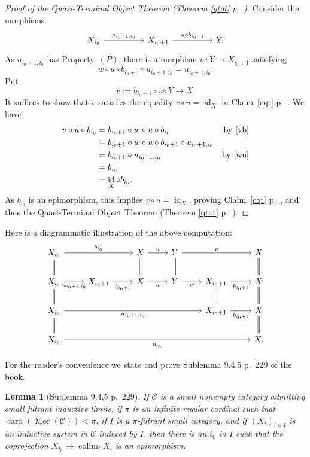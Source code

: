 \documentclass[12pt]{article}
\newtheorem{lem}[thm]{Lemma}
\theoremstyle{remark}
\theoremstyle{definition}
\newcommand{\C}{\mathcal C}
\DeclareMathOperator*{\colim}{colim}
\DeclareMathOperator{\card}{card}
\DeclareMathOperator{\id}{id}
\DeclareMathOperator{\Mor}{Mor}
\begin{document}
\begin{proof}[Proof of the Quasi-Terminal Object Theorem (Theorem \ref{qtot} p.~\pageref{qtot})]
Consider the morphisms 
$$
\begin{tikzcd}
X_{i_0}\ar{rr}{u_{i_0+1,i_0}}&&X_{i_0+1}\ar{rr}{u\circ b_{i_0+1}}&&Y.
\end{tikzcd}
$$
As $u_{i_0+1,i_0}$ has Property~$(P)$, there is a morphism $w:Y\to X_{i_0+1}$ satisfying  
%
\begin{equation}\label{wu}
w\circ u\circ b_{i_0+1}\circ u_{i_0+1,i_0}=u_{i_0+1,i_0}.
\end{equation}  
% 
Put
%
\begin{equation}\label{vb}
v:=b_{i_0+1}\circ w:Y\to X.
\end{equation}
%
It suffices to show that $v$ satisfies the equality $v\circ u=\id_X$ in Claim~\ref{cqt} p.~\pageref{cqt}. We have 
%
\begin{align*}
v\circ u\circ b_{i_0}&=b_{i_0+1}\circ w\circ u\circ b_{i_0}&\text{by \eqref{vb}}\\ 
&=b_{i_0+1}\circ w\circ u\circ b_{i_0+1}\circ u_{i_0+1,i_0}\\ 
&=b_{i_0+1}\circ u_{i_0+1,i_0}&\text{by \eqref{wu}}\\ 
&=b_{i_0}\\ 
&=\id_X\circ b_{i_0}. 
\end{align*}
%
As $b_{i_0}$ is an epimorphism, this implies $v\circ u=\id_X$, proving Claim~\ref{cqt} p.~\pageref{cqt}, and thus the Quasi-Terminal Object Theorem (Theorem \ref{qtot} p.~\pageref{qtot}). 
\end{proof}

Here is a diagrammatic illustration of the above computation:
$$
\begin{tikzcd}
X_{i_0}\ar[equal]{d}\ar{rr}{b_{i_0}}&&X\ar[equal]{d}\ar{r}{u}&Y\ar[equal]{d}\ar{rr}{v}&&X\ar[equal]{d}\\ 
X_{i_0}\ar[equal]{d}\ar{r}[swap]{u_{i_0+1,i_0}}&X_{i_0+1}\ar{r}[swap]{b_{i_0+1}}&X\ar{r}[swap]{u}&Y\ar{r}[swap]{w}&X_{i_0+1}\ar[equal]{d}\ar{r}[swap]{b_{i_0+1}}&X\ar[equal]{d}\\ 
X_{i_0}\ar[equal]{d}\ar{rrrr}[swap]{u_{i_0+1,i_0}}&&&&X_{i_0+1}\ar{r}[swap]{b_{i_0+1}}&X\ar[equal]{d}\\ 
X_{i_0}\ar{rrrrr}[swap]{b_{i_0}}&&&&&X.
\end{tikzcd}
$$ 

For the reader's convenience we state and prove Sublemma 9.4.5 p.~229 of the book.

\begin{lem}[Sublemma 9.4.5 p.~229]\label{945}
If $\C$ is a small nonempty category admitting small filtrant inductive limits, if $\pi$ is an infinite regular cardinal such that $\card(\Mor(\C))<\pi$, if $I$ is a $\pi$-filtrant small category, and if $(X_i)_{i\in I}$ is an inductive system in $\C$ indexed by $I$, then there is an $i_0$ in $I$ such that the coprojection $X_{i_0}\to\colim_iX_i$ is an epimorphism. 
\end{lem}
\end{document}

